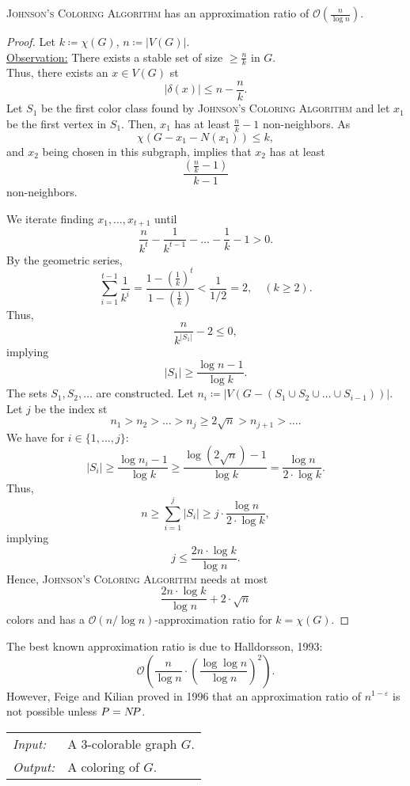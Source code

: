 \documentclass[../skript.tex]{subfiles}
\begin{document}
\EndAlgorithmLine
\begin{theorem} %
\textsc{Johnson's Coloring Algorithm} has an approximation ratio of $\mathcal{O}(\frac{n}{\log n})$.
\end{theorem}
\begin{proof}
Let $k \coloneqq \chi(G)$, $n \coloneqq |V(G)|$. \\
\underline{Observation:} There exists a stable set of size $\geq \frac{n}{k}$ in $G$. \\
Thus, there exists an $x \in V(G)$ \ac{st}
\[
	|\delta(x)| \leq n - \frac{n}{k}.
\]
Let $S_1$ be the first color class found by \textsc{Johnson's Coloring Algorithm} and let $x_1$ be the first vertex in $S_1$. Then, $x_1$ has at least $\frac{n}{k} - 1$ non-neighbors.
As
\[
	\chi(G - x_1 - N(x_1)) \leq k,
\]
and $x_2$ being chosen in this subgraph, implies that $x_2$ has at least
\[
	\frac{ \left( \frac{n}{k} - 1 \right) }{ k - 1 }
\]
non-neighbors.

We iterate finding $x_1, \ldots, x_{t+1}$ until
\[
	\frac{n}{k^t} - \frac{1}{k^{t-1}} - \ldots - \frac{1}{k} - 1 > 0.
\]
By the geometric series,
\[
	\sum_{i=1}^{t-1} \frac{1}{k^i} = \frac{1 - \left( \frac{1}{k} \right)^t}{1 - \left( \frac{1}{k} \right)} < \frac{1}{1/2} = 2, \quad (k \geq 2).
\]
Thus,
\[
	\frac{n}{k^{|S_1|}} - 2 \leq 0,
\]
implying
\[
	|S_1| \geq \frac{\log n - 1}{\log k}.
\]
The sets $S_1, S_2, \ldots$ are constructed. Let $n_i \coloneqq |V(G - (S_1 \cup S_2 \cup \ldots \cup S_{i-1}))|$.
Let $j$ be the index \ac{st}
\[
	n_1 > n_2 > \ldots > n_j \geq 2 \sqrt{n} > n_{j+1} > \ldots.
\]
We have for $i \in \{1, \ldots, j\}$:
\[
	|S_i| \geq \frac{\log n_i - 1}{\log k} \geq \frac{\log(2 \sqrt{n}) - 1}{\log k} = \frac{\log n}{2 \cdot \log k}.
\]
Thus,
\[
	n \geq \sum_{i=1}^j |S_i| \geq j \cdot \frac{\log n}{2 \cdot \log k},
\]
implying
\[
	j \leq \frac{2n \cdot \log k}{\log n}.
\]
Hence, \textsc{Johnson's Coloring Algorithm} needs at most
\[
	\frac{2n \cdot \log k}{\log n} + 2 \cdot \sqrt{n}
\]
colors and has a $\mathcal{O}(n/\log n)$-approximation ratio for $k = \chi(G)$.
\end{proof}
The best known approximation ratio is due to Halldorsson, 1993:
\[
	\mathcal{O} \left( \frac{n}{\log n} \cdot \left( \frac{\log \log n}{\log n} \right)^2 \right).
\]
However, Feige and Kilian proved in 1996 that an approximation ratio of $n^{1 - \varepsilon}$ is not possible unless $P = N \! P$.
\begin{algorithmbox}
\begin{tabular}{@{}ll}
\textit{Input:} & A 3-colorable graph $G$. \\
\textit{Output:} & A coloring of $G$.
\end{tabular}
\end{algorithmbox}
\end{document}
